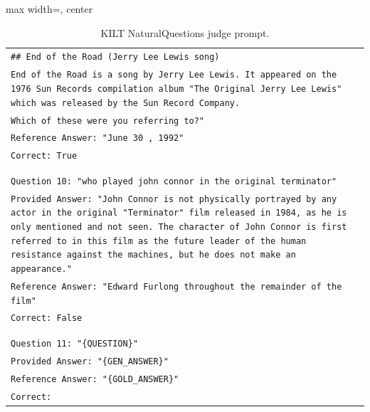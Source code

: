 \documentclass[11pt]{article}
\begin{document}
\begin{table}[ht]
\begin{adjustbox}{max width=\textwidth, center}
\begin{tabular}{>{\raggedright\arraybackslash\tt}p{}<{}}
\\
\#\# End of the Road (Jerry Lee Lewis song)\\
End of the Road is a song by Jerry Lee Lewis. It appeared on the 1976 Sun Records compilation album "The Original Jerry Lee Lewis" which was released by the Sun Record Company.
\\
Which of these were you referring to?"\\
Reference Answer: "June 30 , 1992"\\
Correct: True\\
\\
\\
Question 10: "who played john connor in the original terminator"\\
Provided Answer: "John Connor is not physically portrayed by any actor in the original "Terminator" film released in 1984, as he is only mentioned and not seen. The character of John Connor is first referred to in this film as the future leader of the human resistance against the machines, but he does not make an appearance."\\
Reference Answer: "Edward Furlong throughout the remainder of the film"\\
Correct: False\\
\\
\\
Question 11: "\{QUESTION\}"\\
Provided Answer: "\{GEN\_ANSWER\}"\\
Reference Answer: "\{GOLD\_ANSWER\}"\\
Correct:\\
        \bottomrule
    \end{tabular}
\end{adjustbox}
    \caption{KILT NaturalQuestions judge prompt.
    }
    \label{tab:nq_kilt_prompt}
\end{table}
\end{document}
